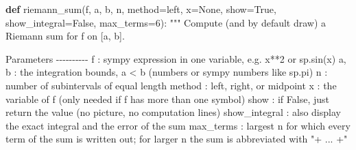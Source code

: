 \documentclass[
  letterpaper,
  DIV=11,
  numbers=noendperiod]{scrreprt}
\newenvironment{Shaded}{\begin{snugshade}}{\end{snugshade}}
\newcommand{\CommentTok}[1]{\textcolor[rgb]{0.37,0.37,0.37}{#1}}
\newcommand{\DecValTok}[1]{\textcolor[rgb]{0.68,0.00,0.00}{#1}}
\newcommand{\KeywordTok}[1]{\textcolor[rgb]{0.00,0.23,0.31}{\textbf{#1}}}
\newcommand{\NormalTok}[1]{\textcolor[rgb]{0.00,0.23,0.31}{#1}}
\newcommand{\OperatorTok}[1]{\textcolor[rgb]{0.37,0.37,0.37}{#1}}
\newcommand{\StringTok}[1]{\textcolor[rgb]{0.13,0.47,0.30}{#1}}
\newcommand{\VariableTok}[1]{\textcolor[rgb]{0.07,0.07,0.07}{#1}}
\theoremstyle{plain}
\theoremstyle{plain}
\theoremstyle{definition}
\theoremstyle{definition}
\theoremstyle{definition}
\theoremstyle{plain}
\theoremstyle{plain}
\theoremstyle{remark}
\begin{document}
\begin{Shaded}
\begin{Highlighting}[]
\KeywordTok{def}\NormalTok{ riemann\_sum(f, a, b, n, method}\OperatorTok{=}\StringTok{\textquotesingle{}left\textquotesingle{}}\NormalTok{, x}\OperatorTok{=}\VariableTok{None}\NormalTok{, show}\OperatorTok{=}\VariableTok{True}\NormalTok{,}
\NormalTok{                show\_integral}\OperatorTok{=}\VariableTok{False}\NormalTok{, max\_terms}\OperatorTok{=}\DecValTok{6}\NormalTok{):}
    \CommentTok{"""}
\CommentTok{    Compute (and by default draw) a Riemann sum for f on [a, b].}

\CommentTok{    Parameters}
\CommentTok{    {-}{-}{-}{-}{-}{-}{-}{-}{-}{-}}
\CommentTok{    f : sympy expression in one variable, e.g. x**2 or sp.sin(x)}
\CommentTok{    a, b : the integration bounds, a \textless{} b (numbers or sympy numbers like sp.pi)}
\CommentTok{    n : number of subintervals of equal length}
\CommentTok{    method : \textquotesingle{}left\textquotesingle{}, \textquotesingle{}right\textquotesingle{}, or \textquotesingle{}midpoint\textquotesingle{}}
\CommentTok{    x : the variable of f (only needed if f has more than one symbol)}
\CommentTok{    show : if False, just return the value (no picture, no computation lines)}
\CommentTok{    show\_integral : also display the exact integral and the error of the sum}
\CommentTok{    max\_terms : largest n for which every term of the sum is written out;}
\CommentTok{                for larger n the sum is abbreviated with "+ ... +"}


\end{Highlighting}
\end{Shaded}
\end{document}
